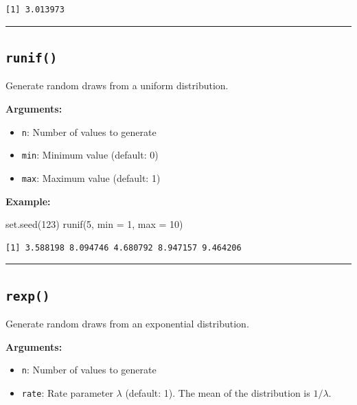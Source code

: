 \documentclass[
  letterpaper,
  DIV=11,
  numbers=noendperiod]{scrreprt}
\newenvironment{Shaded}{\begin{snugshade}}{\end{snugshade}}
\newcommand{\AttributeTok}[1]{\textcolor[rgb]{0.40,0.45,0.13}{#1}}
\newcommand{\DecValTok}[1]{\textcolor[rgb]{0.68,0.00,0.00}{#1}}
\newcommand{\FunctionTok}[1]{\textcolor[rgb]{0.28,0.35,0.67}{#1}}
\newcommand{\NormalTok}[1]{\textcolor[rgb]{0.00,0.23,0.31}{#1}}
\providecommand{\tightlist}{%
  \setlength{\itemsep}{0pt}\setlength{\parskip}{0pt}}
\begin{document}
\begin{verbatim}
[1] 3.013973
\end{verbatim}

\begin{center}\rule{0.5\linewidth}{0.5pt}\end{center}

\subsection{\texorpdfstring{\texttt{runif()}}{runif()}}\label{runif}

Generate random draws from a uniform distribution.

\textbf{Arguments:}

\begin{itemize}
\tightlist
\item
  \texttt{n}: Number of values to generate
\item
  \texttt{min}: Minimum value (default: 0)
\item
  \texttt{max}: Maximum value (default: 1)
\end{itemize}

\textbf{Example:}

\begin{Shaded}
\begin{Highlighting}[]
\FunctionTok{set.seed}\NormalTok{(}\DecValTok{123}\NormalTok{)}
\FunctionTok{runif}\NormalTok{(}\DecValTok{5}\NormalTok{, }\AttributeTok{min =} \DecValTok{1}\NormalTok{, }\AttributeTok{max =} \DecValTok{10}\NormalTok{)}
\end{Highlighting}
\end{Shaded}

\begin{verbatim}
[1] 3.588198 8.094746 4.680792 8.947157 9.464206
\end{verbatim}

\begin{center}\rule{0.5\linewidth}{0.5pt}\end{center}

\subsection{\texorpdfstring{\texttt{rexp()}}{rexp()}}\label{rexp}

Generate random draws from an exponential distribution.

\textbf{Arguments:}

\begin{itemize}
\tightlist
\item
  \texttt{n}: Number of values to generate
\item
  \texttt{rate}: Rate parameter \(\lambda\) (default: 1). The mean of
  the distribution is \(1/\lambda\).
\end{itemize}
\end{document}
